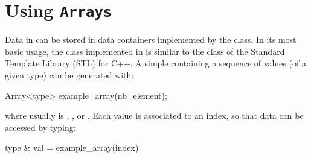 

\section{Using \texttt{Arrays}}

Data in \akantu can be stored in data containers implemented by
the  class. In its most basic usage, the  class
implemented in \akantu is similar to the  class of
the Standard Template Library (STL) for C++. A simple 
containing a sequence of  values (of a given type) can be generated with:
\begin{cpp}
  Array<type> example_array(nb_element);
\end{cpp}
where  usually is , ,  or
. Each value is associated to an index, so that data can be
accessed by typing:

\begin{cpp}
  type & val = example_array(index)
\end{cpp}

